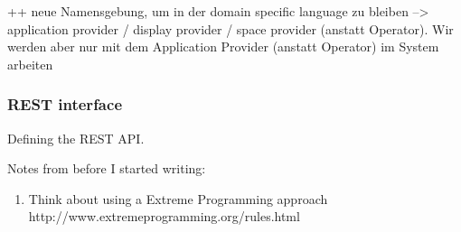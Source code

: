 ++ neue Namensgebung, um in der domain specific language zu bleiben --> application provider / display provider / space provider (anstatt Operator). Wir werden aber nur mit dem Application Provider (anstatt Operator) im System arbeiten





\subsubsection{REST interface}

Defining the REST API. 


Notes from before I started writing: 
\begin{enumerate}
\item Think about using a Extreme Programming approach http://www.extremeprogramming.org/rules.html
\end{enumerate}